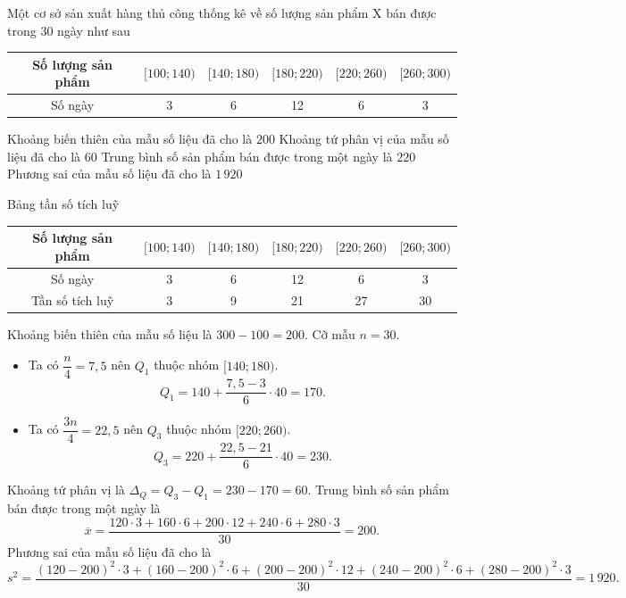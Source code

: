 \cauds
\begin{ex}%
	Một cơ sở sản xuất hàng thủ công thống kê về số lượng sản phẩm X bán được trong 30 ngày như sau
	\begin{center}
		\begin{tabular}{|c|c|c|c|c|c|}
			\hline
			Số lượng sản phẩm & $[100;140)$ & $[140;180)$ & $[180;220)$ & $[220;260)$ & $[260;300)$ \\
			\hline
			Số ngày & 3 & 6 & 12 & 6 & 3 \\
			\hline
		\end{tabular}
	\end{center}
	\choiceTF
	{\True Khoảng biến thiên của mẫu số liệu đã cho là $200$}
	{\True Khoảng tứ phân vị của mẫu số liệu đã cho là $60$}
	{Trung bình số sản phẩm bán được trong một ngày là $220$}
	{\True Phương sai của mẫu số liệu đã cho là $1\,920$}
	\loigiai
	{
		Bảng tần số tích luỹ
		\begin{center}
			\begin{tabular}{|c|c|c|c|c|c|}
				\hline
				Số lượng sản phẩm & $[100;140)$ & $[140;180)$ & $[180;220)$ & $[220;260)$ & $[260;300)$ \\
				\hline
				Số ngày & 3 & 6 & 12 & 6 & 3 \\
				\hline
				Tần số tích luỹ &3&9&21&27&30\\
				\hline
			\end{tabular}
		\end{center}
		\begin{itemchoice}
			\itemch Khoảng biến thiên của mẫu số liệu là $300-100=200$.
			\itemch Cỡ mẫu $n=30$.
			\begin{itemize}
				\item Ta có $\dfrac{n}{4}=7{,}5$ nên $Q_1$ thuộc nhóm $[140;180)$.
				\[
				Q_1= 140+ \dfrac{7{,}5-3}{6}\cdot 40= 170.
				\]
				\item Ta có $\dfrac{3n}{4}= 22{,}5$ nên $Q_3$ thuộc nhóm $[220;260)$.
				\[
				Q_3= 220+ \dfrac{22{,}5-21}{6}\cdot 40= 230.
				\] 
			\end{itemize}
			Khoảng tứ phân vị là $\Delta_Q= Q_3-Q_1= 230-170=60$.
			\itemch Trung bình số sản phẩm bán được trong một ngày là
			\[
			\overline{x}= \dfrac{120\cdot 3 + 160 \cdot 6 + 200 \cdot 12 + 240 \cdot 6 + 280 \cdot 3}{30}= 200.
			\]
			\itemch Phương sai của mẫu số liệu đã cho là
			\[
			s^2= \dfrac{(120-200)^2 \cdot 3 + (160-200)^2 \cdot 6 + (200-200)^2 \cdot 12+ (240-200)^2 \cdot 6 + (280-200)^2 \cdot 3}{30}= 1\,920.
			\]
		\end{itemchoice}
	}
\end{ex}

